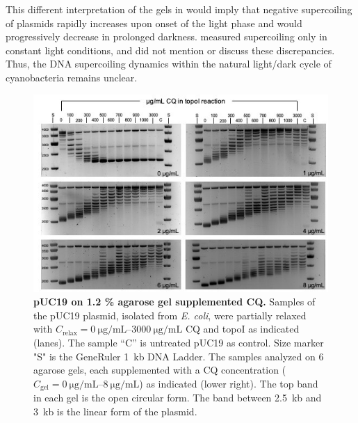 \documentclass[10pt,a4]{article}
\newcommand{\ugml}{\micro\gram\per\milli\liter}
\newcommand{\cqgel}{\ensuremath{C_{\text{gel}}}}
\newcommand{\cqtop}{\ensuremath{C_{\text{relax}}}}
\begin{document}
This different interpretation of the gels in \citet{Woelfle2007} would
imply that negative supercoiling of plasmids rapidly increases upon
onset of the light phase and would progressively decrease in prolonged
darkness.  \citet{Vijayan2009} measured supercoiling only in constant
light conditions, and did not mention or discuss these discrepancies.
Thus, the DNA supercoiling dynamics within the natural light/dark
cycle of cyanobacteria remains unclear.

\begin{figure}[ht!]
    \includegraphics[width=\textwidth]{figures/keller_puc19.jpg}
  \caption{\textbf{pUC19 on 1.2 \% agarose gel supplemented CQ.}
    Samples of the pUC19 plasmid, isolated from \textit{E. coli}, were
    partially relaxed with $\cqtop=\SIrange{0}{3000}{\ugml}$ CQ and
    topoI as indicated (lanes). The sample “C” is untreated pUC19 as
    control. Size marker "S" is the GeneRuler \SI{1}{kb} DNA
    Ladder. The samples analyzed on 6 agarose gels, each supplemented
    with a CQ concentration ($\cqgel=\SIrange{0}{8}{\ugml}$) as
    indicated (lower right). The top band in each gel is the open
    circular form. The band between \SI{2.5}{kb} and \SI{3}{kb} is the
    linear form of the plasmid.}
  \label{fig:keller} 
\end{figure}
\end{document}
